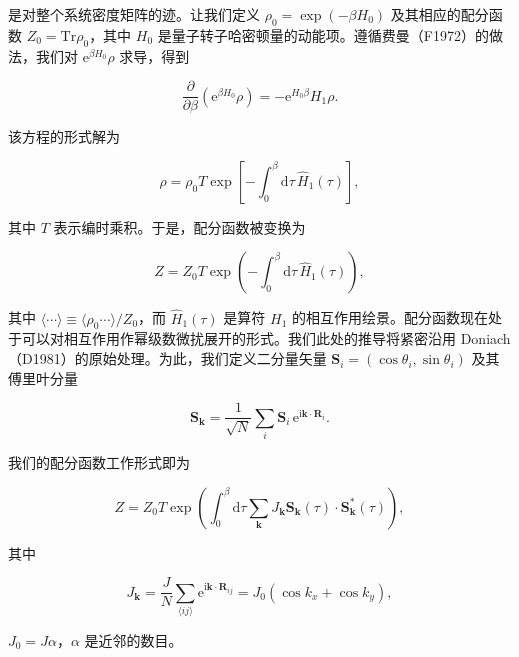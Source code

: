 是对整个系统密度矩阵的迹。让我们定义 $\rho_0=\exp(-\beta H_0)$ 及其相应的配分函数 $Z_0=\mathrm{Tr}\rho_0$，其中 $H_0$ 是量子转子哈密顿量的动能项。遵循费曼（F1972）的做法，我们对 $\mathrm{e}^{\beta H_0}\rho$ 求导，得到

\begin{equation*}
\frac{\partial}{\partial\beta} \left( \mathrm{e}^{\beta H_0}\rho \right) = -\mathrm{e}^{H_0\beta} H_1\rho.\tag{14.16}
\end{equation*}

该方程的形式解为

\begin{equation*}
\rho = \rho_0 T \exp\left[ -\int_0^{\beta} \mathrm{d}\tau\, \hat{H}_1(\tau) \right],\tag{14.17}
\end{equation*}

其中 $T$ 表示编时乘积。于是，配分函数被变换为

\begin{equation*}
Z = Z_0 \left. T \exp\left( -\int_0^{\beta} \mathrm{d}\tau\, \hat{H}_1(\tau) \right) \right.,\tag{14.18}
\end{equation*}

其中 $\langle\cdots\rangle\equiv\langle\rho_0\cdots\rangle/Z_0$，而 $\hat{H}_1(\tau)$ 是算符 $H_1$ 的相互作用绘景。配分函数现在处于可以对相互作用作幂级数微扰展开的形式。我们此处的推导将紧密沿用 Doniach（D1981）的原始处理。为此，我们定义二分量矢量 $\mathbf{S}_i=(\cos\theta_i,\sin\theta_i)$ 及其傅里叶分量

\begin{equation*}
\mathbf{S}_{\mathbf{k}} = \frac{1}{\sqrt{N}} \sum_i \mathbf{S}_i\, \mathrm{e}^{\mathrm{i}\mathbf{k}\cdot\mathbf{R}_i}.\tag{14.19}
\end{equation*}

我们的配分函数工作形式即为

\begin{equation*}
Z = Z_0 \left. T \exp\left( \int_0^{\beta} \mathrm{d}\tau \sum_{\mathbf{k}} J_{\mathbf{k}} \mathbf{S}_{\mathbf{k}}(\tau)\cdot\mathbf{S}_{\mathbf{k}}^{*}(\tau) \right) \right.,\tag{14.20}
\end{equation*}

其中

\begin{equation*}
J_{\mathbf{k}} = \frac{J}{N} \sum_{\langle ij\rangle} \mathrm{e}^{\mathrm{i}\mathbf{k}\cdot\mathbf{R}_{ij}} = J_0(\cos k_x + \cos k_y),\tag{14.21}
\end{equation*}

$J_0=J\alpha$，$\alpha$ 是近邻的数目。

